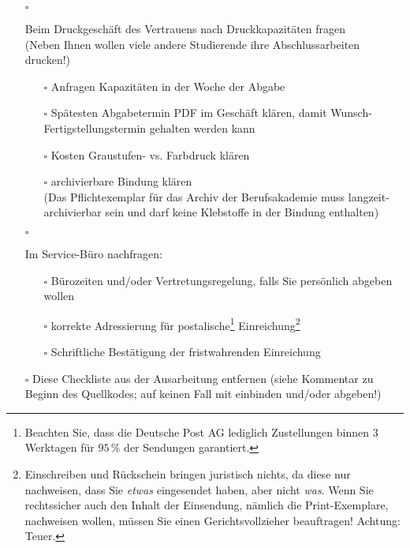 \begin{itemize}
{        \begin{itemize}
             \item[$\square$]{
                Beim Druckgeschäft des Vertrauens nach Druckkapazitäten fragen\\
                (Neben Ihnen wollen viele andere Studierende ihre Abschlussarbeiten drucken!)
                \begin{itemize}
                    \item[$\square$] Anfragen Kapazitäten in der Woche der Abgabe
                    \item[$\square$] Spätesten Abgabetermin PDF im Geschäft klären, damit Wunsch-Fer\-tig\-stel\-lungs\-ter\-min gehalten werden kann
                    \item[$\square$] Kosten Graustufen- vs. Farbdruck klären
                    \item[$\square$]{
                        archivierbare Bindung klären\\
                        (Das Pflichtexemplar für das Archiv der Berufsakademie muss langzeit-ar\-chi\-vier\-bar sein und darf keine Klebstoffe in der Bindung enthalten)
                    }
                \end{itemize}
            }
            \item[$\square$]{
                Im Service-Büro nachfragen:
                \begin{itemize}
                    \item[$\square$] Bürozeiten und/oder Vertretungsregelung, falls Sie persönlich abgeben wollen
                    \item[$\square$] korrekte Adressierung für postalische\footnote{Beachten Sie, dass die Deutsche Post AG lediglich Zustellungen binnen $3$ Werktagen für $95\,\%$ der Sendungen garantiert.} Einreichung\footnote{Einschreiben und Rückschein bringen juristisch nichts, da diese nur nachweisen, dass Sie \emph{etwas} eingesendet haben, aber nicht \emph{was}. Wenn Sie rechtssicher auch den Inhalt der Einsendung, nämlich die Print-Exemplare, nachweisen wollen, müssen Sie einen Gerichtsvollzieher beauftragen! Achtung: Teuer.}
                    \item[$\square$] Schriftliche Bestätigung der fristwahrenden Einreichung
                \end{itemize}
            }
            \item[$\square$]{\color{red}
                Diese Checkliste aus der Ausarbeitung entfernen (siehe Kommentar zu Beginn des Quellkodes; auf keinen Fall mit einbinden und/oder abgeben!)
}
\end{itemize}}
\end{itemize}
